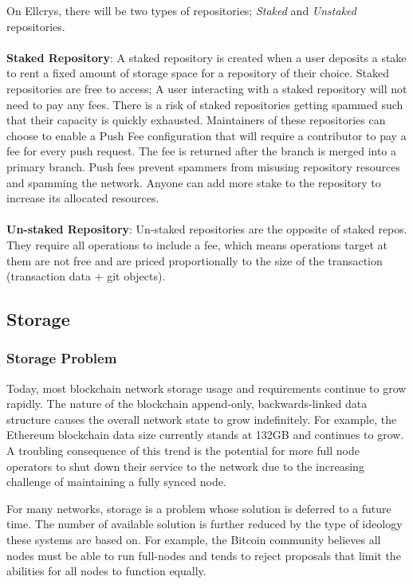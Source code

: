 On Ellcrys, there will be two types of repositories; \textit{Staked} and \textit{Unstaked} repositories. \\\\

\noindent
\textbf{Staked Repository}: A staked repository is created when a user deposits a stake to rent a fixed amount of storage space for a repository of their choice. Staked repositories are free to access; A user interacting with a staked repository will not need to pay any fees. There is a risk of staked repositories getting spammed such that their capacity is quickly exhausted. Maintainers of these repositories can choose to enable a Push Fee configuration that will require a contributor to pay a fee for every push request. The fee is returned after the branch is merged into a primary branch. Push fees prevent spammers from misusing repository resources and spamming the network. Anyone can add more stake to the repository to increase its allocated resources.\\\\


\noindent
\textbf{Un-staked Repository}:
Un-staked repositories are the opposite of staked repos. They require all operations to include a fee, which means operations target at them are not free and are priced proportionally to the size of the transaction (transaction data + git objects).



\subsection{Storage}

\subsubsection{Storage Problem}
Today, most blockchain network storage usage and requirements continue to grow rapidly. The nature of the blockchain append-only, backwards-linked data structure causes the overall network state to grow indefinitely. For example, the Ethereum blockchain data size currently stands at 132GB and continues to grow. A troubling consequence of this trend is the potential for more full node operators to shut down their service to the network due to the increasing challenge of maintaining a fully synced node.

For many networks, storage is a problem whose solution is deferred to a future time. The number of available solution is further reduced by the type of ideology these systems are based on. For example, the Bitcoin community believes all nodes must be able to run full-nodes and tends to reject proposals that limit the abilities for all nodes to function equally.

